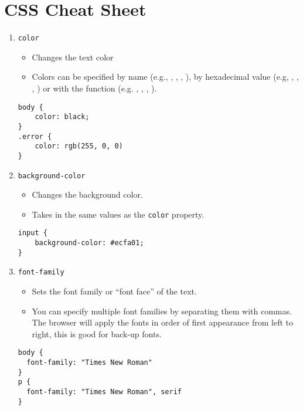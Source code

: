\documentclass[12pt]{article}
\begin{document}
\section{CSS Cheat Sheet}
\begin{enumerate}

\item{\texttt{color}}  
\begin{itemize}
    \item Changes the text color
    \item Colors can be specified by name (e.g., , , , ), by hexadecimal value (e.g, , , , ) or with the  function (e.g. , , , ).
\end{itemize}
\begin{lstlisting}[frame=single]
body {
    color: black;
}
.error {
    color: rgb(255, 0, 0)
}
\end{lstlisting}

\item{\texttt{background-color}}
\begin{itemize}
    \item Changes the background color.  
    \item Takes in the same values as the \texttt{color} property.
\end{itemize}    
\begin{lstlisting}[frame=single]
input {
    background-color: #ecfa01; 
}
\end{lstlisting}
    
\item{\texttt{font-family}}
\begin{itemize}
    \item Sets the font family or ``font face'' of the text.
    \item You can specify multiple font families by separating them with commas.  The browser will apply the fonts in order of first appearance from left to right, this is good for back-up fonts.
\end{itemize}    
\begin{lstlisting}[frame=single]
body {
  font-family: "Times New Roman"
}
p {
  font-family: "Times New Roman", serif
}
\end{lstlisting}
    


\end{enumerate}
\end{document}
